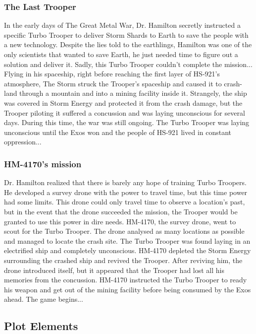 \documentclass[12pt]{article}
\begin{document}
\subsubsection{The Last Trooper}

In the early days of The Great Metal War, Dr. Hamilton secretly instructed a specific Turbo Trooper to deliver Storm Shards to Earth to save the people with a new technology. Despite the lies told to the earthlings, Hamilton was one of the only scientists that wanted to save Earth, he just needed time to figure out a solution and deliver it. Sadly, this Turbo Trooper couldn't complete the mission... Flying in his spaceship, right before reaching the first layer of HS-921's atmosphere, The Storm struck the Trooper's spaceship and caused it to crash-land through a mountain and into a mining facility inside it. Strangely, the ship was covered in Storm Energy and protected it from the crash damage, but the Trooper piloting it suffered a concussion and was laying unconscious for several days. During this time, the war was still ongoing. The Turbo Trooper was laying unconscious until the Exos won and the people of HS-921 lived in constant oppression...

\subsubsection{HM-4170's mission}

Dr. Hamilton realized that there is barely any hope of training Turbo Troopers. He developed a survey drone with the power to travel time, but this time power had some limits. This drone could only travel time to observe a location's past, but in the event that the drone succeeded the mission, the Trooper would be granted to use this power in dire needs. HM-4170, the survey drone, went to scout for the Turbo Trooper. The drone analysed as many locations as possible and managed to locate the crash site. The Turbo Trooper was found laying in an electrified ship and completely unconscious. HM-4170 depleted the Storm Energy surrounding the crashed ship and revived the Trooper. After reviving him, the drone introduced itself, but it appeared that the Trooper had lost all his memories from the concussion. HM-4170 instructed the Turbo Trooper to ready his weapon and get out of the mining facility before being consumed by the Exos ahead. The game begins... 

\subsection{Plot Elements}
\end{document}
